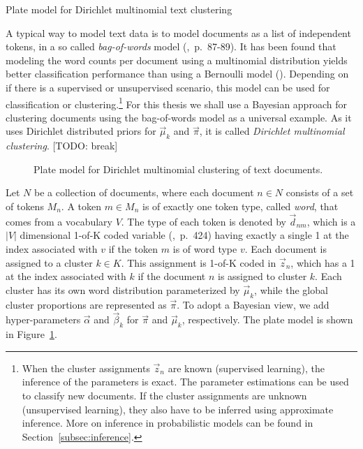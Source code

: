 \begin{Example} Plate model for Dirichlet multinomial text clustering
\label{ex:clustering-pm}

A typical way to model text data is to model documents as a list of independent tokens, in a so called \emph{bag-of-words} model (\cite{murphy2012machine},~p.~87-89). It has been found that modeling the word counts per document using a multinomial distribution yields better classification performance than using a Bernoulli model (\cite{mccallum1998comparison}). Depending on if there is a supervised or unsupervised scenario, this model can be used for classification or clustering.\footnote{When the cluster assignments $\vec z_n$ are known (supervised learning), the inference of the parameters is exact. The parameter estimations can be used to classify new documents. If the cluster assignments are unknown (unsupervised learning), they also have to be inferred using approximate inference. More on inference in probabilistic models can be found in Section~\ref{subsec:inference}.} For this thesis we shall use a Bayesian approach for clustering documents using the bag-of-words model as a universal example. As it uses Dirichlet distributed priors for $\vec \mu_k$ and $\vec \pi$, it is called \emph{Dirichlet multinomial clustering}. [TODO: break]

\begin{figure}[t]
	\begin{center}
    	\scalebox{\tikzScale}{\adjustTikzSize }
	\end{center}
\caption[Plate model for Dirichlet multinomial clustering of text documents]{Plate model for Dirichlet multinomial clustering of text documents.}
		\label{fig:clustering_platemodel}
\end{figure}

Let $N$ be a collection of documents, where each document $n \in N$ consists of a set of tokens $M_n$. A token $m \in M_n$ is of exactly one token type, called \emph{word}, that comes from a vocabulary $V$. The type of each token is denoted by $\vec d_{nm}$, which is a $|V|$ dimensional 1-of-K coded variable (\cite{bishop2006pattern},~p.~424) having exactly a single 1 at the index associated with $v$ if the token $m$ is of word type $v$. Each document is assigned to a cluster $k \in K$. This assignment is 1-of-K coded in $\vec z_{n}$, which has a 1 at the index associated with $k$ if the document $n$ is assigned to cluster $k$. Each cluster has its own word distribution parameterized by $\vec \mu_k$, while the global cluster proportions are represented as $\vec \pi$. To adopt a Bayesian view, we add hyper-parameters $\vec \alpha$ and $\vec \beta_k$ for $\vec \pi$ and $\vec \mu_k$, respectively. The plate model is shown in Figure~\ref{fig:clustering_platemodel}.


\end{Example}
